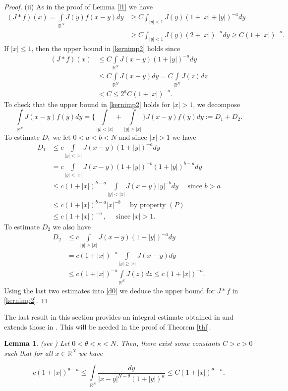 \documentclass[leqno,12pt]{article}
\newcommand{\intl}{\int\limits}
\newcommand{\R}{\mathbb R}
\newtheorem{lemma}[theorem]{Lemma}
\numberwithin{equation}{section}
\begin{document}
\begin{proof}
(ii) As in the proof of Lemma \ref{l1} we have
$$
\begin{aligned}
(J*f)(x)=\intl_{\R^N} J(y)f(x-y)d y & \geq C  \int_{|y|<1} J(y) (1+|x|+|y|)^{-a} dy \\
& \geq C \int_{|y|<1} J(y) (2+|x|)^{-a} dy \geq  C (1+|x|)^{-a}.
\end{aligned}
$$
If $|x|\leq 1$, then the upper bound in \eqref{kernimp2} holds since
$$
\begin{aligned}
(J*f)(x) & \leq C\intl_{\R^N} J(x-y)(1+|y|)^{-a} dy\\
& \leq C\intl_{\R^N}J(x-y)dy=C\intl_{\R^N}J(z) dz\\
&<C\leq 2^{a}C(1+|x|)^{-a}.
\end{aligned}
$$
To check that the upper bound in \eqref{kernimp2} holds for $|x|>1$, we decompose
\begin{equation}\label{d0}
\intl_{\R^N} J(x-y)f(y) dy=\Big\{ \intl_{|y|<|x|} +\intl_{|y|\geq |x|} \Big\} J(x-y)f(y) dy:=D_1+D_2.
\end{equation}
To estimate $D_1$ we let $0<a<b<N$ and since $|x|>1$ we have
$$
\begin{aligned}
D_1&\leq c \intl_{|y|<|x|} J(x-y)(1+|y|)^{-a} dy\\
&= c \intl_{|y|<|x|} J(x-y)(1+|y|)^{-b} (1+|y|)^{b-a} dy\\
&\leq c (1+|x|)^{b-a} \intl_{|y|<|x|} J(x-y) |y|^{-b} dy \quad \mbox{ since $b>a$}\\
&\leq c (1+|x|)^{b-a} |x|^{-b} \quad\mbox{ by property $(P)$}\\
&\leq c(1+|x|)^{-a} \, , \quad\mbox{ since } |x|>1.
\end{aligned}
$$
To estimate $D_2$ we also have
$$
\begin{aligned}
D_2&\leq c \intl_{|y|\geq |x|} J(x-y)(1+|y|)^{-a} dy\\
&= c (1+|x|)^{-a} \intl_{|y|\geq |x|} J(x-y)  dy\\
&\leq  c (1+|x|)^{-a} \intl_{\R^N} J(z)  dz \leq c(1+|x|)^{-a}.
\end{aligned}
$$
Using the last two estimates into \eqref{d0} we deduce the upper bound for $J*f$ in  \eqref{kernimp2}.
\end{proof}

The last result in this section provides an integral estimate obtained in \cite{GL25} and extends those in \cite{GKS20, GTbook}. This will be needed in the proof of Theorem \ref{thl}.
\begin{lemma}\label{lgl} {\rm (see \cite[Lemma 2.5]{GL25})}
Let $0<\theta<\kappa<N$. Then, there exist some constants $C>c>0$ such that for all $x\in \R^N$ we have 

\begin{equation}\label{st1}
c (1+|x|)^{\theta-\kappa}\leq \intl_{\R^N}\frac{dy}{|x-y|^{N-\theta}(1+|y|)^\kappa}\leq C (1+|x|)^{\theta-\kappa}.
\end{equation}
\end{lemma}
\end{document}
